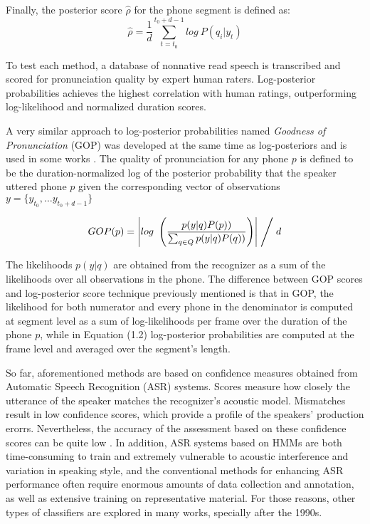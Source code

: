 Finally, the posterior score $\hat{\rho}$ for the phone segment is defined as:
\begin{equation}
\hat{\rho} = \frac{1}{d}\sum_{t=t_{0}}^{t_{0}+d-1} log \ P(q_{i}|y_{t})
\end{equation}

To test each method, a database of nonnative read speech is transcribed and scored for 
pronunciation quality by expert human raters. Log-posterior probabilities achieves the
highest correlation with human ratings, outperforming log-likelihood and normalized duration
scores.

A very similar approach to log-posterior probabilities named \textit{Goodness of Pronunciation}
(GOP) was developed at the same time as log-posteriors and
is used in some works \cite{gop_1, gop_2, gop_3}. The quality of 
pronunciation for any phone $p$ is defined to be the duration-normalized log of the posterior
probability that the speaker uttered phone $p$ given the corresponding vector of observations
$y=\{y_{t_{0}}, \dotsc y_{t_{0}+d-1} \}$

\begin{equation}
GOP(p) = \left| log \ \left(\frac{p(y|q)P(p))}{\sum_{q \in Q}p(y|q)P(q))}\right) \right| \Biggm/ d 
\end{equation}

The likelihoods $p(y|q)$ are obtained from the recognizer as a sum of the likelihoods over all
observations in the phone.
The difference between GOP scores and log-posterior score technique previously mentioned 
is that in GOP, the likelihood for both numerator and every phone in the denominator is
computed at segment level as a sum of log-likelihoods per frame over the 
duration of the phone $p$, while in Equation (1.2) log-posterior probabilities are computed
at the frame level and averaged over the segment's length.

So far, aforementioned methods are based on confidence measures 
obtained from Automatic Speech Recognition (ASR) systems. 
Scores measure how closely the utterance of the speaker matches the recognizer's
acoustic model. Mismatches result in low confidence scores, which provide a profile of the 
speakers' production erorrs. Nevertheless, the accuracy of the assessment based on these
confidence scores can be quite low \cite{landmark_svm}. 
In addition, ASR systems based on HMMs are both time-consuming to train and extremely vulnerable to
acoustic interference and variation in speaking style, and the conventional methods for
enhancing ASR performance often require enormous amounts of data collection and annotation,
as well as extensive training on representative material.
For those reasons, other types of classifiers are explored in many works, specially after
the 1990s. 

